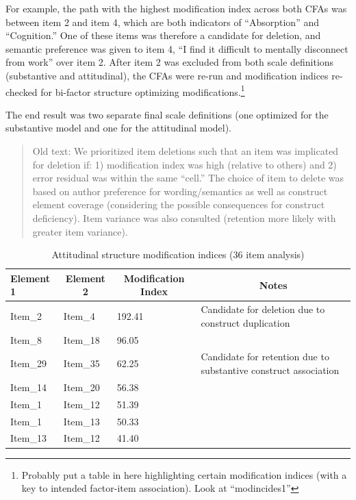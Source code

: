 \documentclass[
  english,
  man]{apa6}
\begin{document}
For example, the path with the highest modification index across both CFAs was between item 2 and item 4, which are both indicators of ``Absorption'' and ``Cognition.'' One of these items was therefore a candidate for deletion, and semantic preference was given to item 4, ``I find it difficult to mentally disconnect from work'' over item 2. After item 2 was excluded from both scale definitions (substantive and attitudinal), the CFAs were re-run and modification indices re-checked for bi-factor structure optimizing modifications.\footnote{Probably put a table in here highlighting certain modification indices (with a key to intended factor-item association). Look at ``modincides1''}

The end result was two separate final scale definitions (one optimized for the substantive model and one for the attitudinal model).

\begin{quote}
Old text: We prioritized item deletions such that an item was implicated for deletion if: 1) modification index was high (relative to others) and 2) error residual was within the same ``cell.'' The choice of item to delete was based on author preference for wording/semantics as well as construct element coverage (considering the possible consequences for construct deficiency). Item variance was also consulted (retention more likely with greater item variance).
\end{quote}

\begin{table}[tbp]

\begin{center}
\begin{threeparttable}

\caption{\label{tab:modindices}Attitudinal structure modification indices (36 item analysis)}

\begin{tabular}{m{2cm}m{2cm}m{2cm}m{7cm}}
\toprule
Element 1 & \multicolumn{1}{c}{Element 2} & \multicolumn{1}{c}{Modification Index} & \multicolumn{1}{c}{Notes}\\
\midrule
Item\_2 & Item\_4 & 192.41 & Candidate for deletion due to construct duplication\\
Item\_8 & Item\_18 & 96.05 & \\
Item\_29 & Item\_35 & 62.25 & Candidate for retention due to substantive construct association\\
Item\_14 & Item\_20 & 56.38 & \\
Item\_1 & Item\_12 & 51.39 & \\
Item\_1 & Item\_13 & 50.33 & \\
Item\_13 & Item\_12 & 41.40 & \\
\bottomrule
\end{tabular}

\end{threeparttable}
\end{center}

\end{table}
\end{document}
